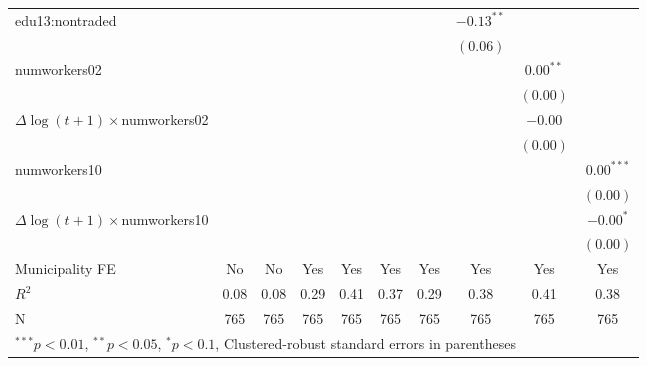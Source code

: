 \begin{tabular}{l c c c c c c c c c }
edu13:nontraded      &              &              &              &               &               &              & $-0.13^{**}$  &               &               \\
                     &              &              &              &               &               &              & $(0.06)$      &               &               \\
numworkers02         &              &              &              &               &               &              &               & $0.00^{**}$   &               \\
                     &              &              &              &               &               &              &               & $(0.00)$      &               \\
$\Delta \log(t+1) \times$numworkers02 &              &              &              &               &               &              &               & $-0.00$       &               \\
                     &              &              &              &               &               &              &               & $(0.00)$      &               \\
numworkers10         &              &              &              &               &               &              &               &               & $0.00^{***}$  \\
                     &              &              &              &               &               &              &               &               & $(0.00)$      \\
$\Delta \log(t+1) \times$numworkers10 &              &              &              &               &               &              &               &               & $-0.00^{*}$   \\
                     &              &              &              &               &               &              &               &               & $(0.00)$      \\
\hline
Municipality FE     &No&No&Yes&Yes&Yes&Yes&Yes&Yes&Yes\\ 
\hline
$R^2$                & 0.08         & 0.08         & 0.29         & 0.41          & 0.37          & 0.29         & 0.38          & 0.41          & 0.38          \\
N                    & 765          & 765          & 765          & 765           & 765           & 765          & 765           & 765           & 765           \\
\hline
\multicolumn{10}{l}{\scriptsize{$^{***}p<0.01$, $^{**}p<0.05$, $^*p<0.1$, Clustered-robust standard errors in parentheses}}
\end{tabular}
